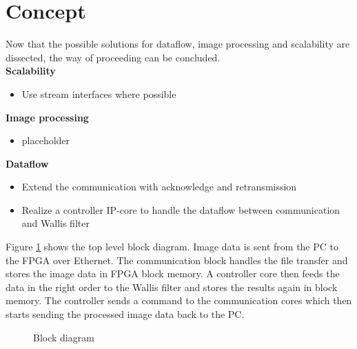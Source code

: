 %
%
\clearpage
\section{Concept} \label{chapt:mission:concept}
Now that the possible solutions for dataflow, image processing and scalability
are dissected, the way of proceeding can be concluded.\\


\textbf{Scalability}
    \begin{itemize}
        \item Use stream interfaces where possible
    \end{itemize}

\textbf{Image processing}
    \begin{itemize}
        \item placeholder
    \end{itemize}

\textbf{Dataflow}
    \begin{itemize}
        \item Extend the communication with acknowledge and retransmission
        \item Realize a controller IP-core to handle the dataflow between
        communication and Wallis filter
    \end{itemize}

Figure \ref{fig:blockdiagram} shows the top level block diagram. Image data is
sent from the PC to the FPGA over Ethernet. The communication block handles the
file transfer and stores the image data in FPGA block memory. A controller core
then feeds the data in the right order to the Wallis filter and stores the
results again in block memory. The controller sends a command to the
communication cores which then starts sending the processed image data back to
the PC.

\begin{figure}[b!]
    \centering
    \caption{Block diagram}
    \label{fig:blockdiagram}
\end{figure}


